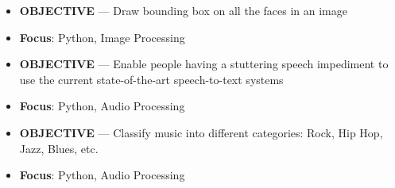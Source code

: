
\begin{itemize}
	\item \textbf{OBJECTIVE} --- Draw bounding box on all the faces in an image
	\item \textbf{Focus}: Python, Image Processing
\end{itemize}


\begin{itemize}
	\item \textbf{OBJECTIVE} --- Enable people having a stuttering speech impediment to use the current state-of-the-art speech-to-text systems
	\item \textbf{Focus}: Python, Audio Processing
\end{itemize}


\begin{itemize}
	\item \textbf{OBJECTIVE} --- Classify music into different categories: Rock, Hip Hop, Jazz, Blues, etc.
	\item \textbf{Focus}: Python, Audio Processing
\end{itemize}

